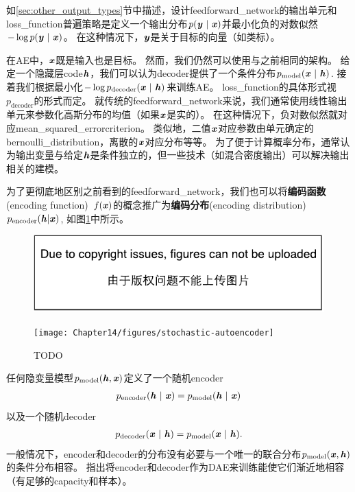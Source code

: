 如\ref{sec:other_output_types}节中描述，设计\gls{feedforward_network}的输出单元和\gls{loss_function}普遍策略是定义一个输出分布$p(\boldsymbol{\mathit{y}} ~|~ \boldsymbol{\mathit{x}}) $并最小化负的对数似然$-\log p(\boldsymbol{\mathit{y}} ~|~ \boldsymbol{\mathit{x}})$。
在这种情况下，$\boldsymbol{\mathit{y}}$是关于目标的向量（如类标）。


在\gls{AE}中，$\boldsymbol{\mathit{x}}$既是输入也是目标。
然而，我们仍然可以使用与之前相同的架构。
给定一个隐藏层\gls{code}$\boldsymbol{\mathit{h}}$，我们可以认为\gls{decoder}提供了一个条件分布$p_{\text{model}}(\boldsymbol{\mathit{x}} ~|~ \boldsymbol{\mathit{h}})$. 
接着我们根据最小化$-\log p_{\text{decoder}}(\boldsymbol{\mathit{x}} ~|~ \boldsymbol{\mathit{h}})$来训练\gls{AE}。
\gls{loss_function}的具体形式视$p_{\text{decoder}}$的形式而定。
就传统的\gls{feedforward_network}来说，我们通常使用线性输出单元来参数化高斯分布的均值（如果$\boldsymbol{\mathit{x}}$是实的）。
在这种情况下，负对数似然就对应\gls{mean_squared_error}\gls{criterion}。
类似地，二值$\boldsymbol{\mathit{x}}$对应参数由单元确定的\gls{bernoulli_distribution}，离散的$\boldsymbol{\mathit{x}}$对应分布等等。
为了便于计算概率分布，通常认为输出变量与给定$\boldsymbol{\mathit{h}}$是条件独立的，但一些技术（如混合密度输出）可以解决输出相关的建模。


为了更彻底地区别之前看到的\gls{feedforward_network}，我们也可以将\textbf{编码函数}(encoding function)~$f(\boldsymbol{\mathit{x}})$的概念推广为\textbf{编码分布}(encoding distribution)~$ p_{\text{encoder}}(\boldsymbol{\mathit{h}} | \boldsymbol{\mathit{x}})$, 如图\ref{fig:chap14_stochastic-autoencoder}中所示。

\begin{figure}[!htb]
\ifOpenSource
\centerline{\includegraphics{figure.pdf}}
\else
\centerline{\texttt{[image: Chapter14/figures/stochastic-autoencoder]}}
\fi
\caption{TODO}
\label{fig:chap14_stochastic-autoencoder}
\end{figure}

任何隐变量模型$p_{\text{model}}(\boldsymbol{\mathit{h}}, \boldsymbol{\mathit{x}})$定义了一个随机\gls{encoder}
\begin{align}
p_{\text{encoder}}(\boldsymbol{\mathit{h}} ~|~ \boldsymbol{\mathit{x}}) = p_{\text{model}}(\boldsymbol{\mathit{h}}~|~\boldsymbol{\mathit{x}})
\end{align}
以及一个随机\gls{decoder}
\begin{align}
p_{\text{decoder}}(\boldsymbol{\mathit{x}} ~|~ \boldsymbol{\mathit{h}}) = p_{\text{model}}(\boldsymbol{\mathit{x}}~|~\boldsymbol{\mathit{h}}).
\end{align}
一般情况下，\gls{encoder}和\gls{decoder}的分布没有必要与一个唯一的联合分布$p_{\text{model}}(\boldsymbol{\mathit{x}}, \boldsymbol{\mathit{h}})$的条件分布相容。
\citet{Alain-et-al-arxiv2015}指出将\gls{encoder}和\gls{decoder}作为\gls{DAE}来训练能使它们渐近地相容（有足够的\gls{capacity}和样本）。



